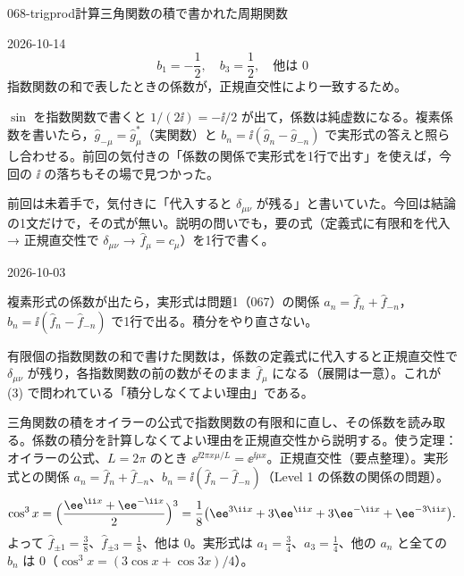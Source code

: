 \documentclass[uplatex,dvipdfmx,a4paper,11pt]{jsarticle}
\begin{document}
\begin{mondai}{068-trigprod}{計算}{三角関数の積で書かれた周期関数}
\begin{kotaeutsushi}{2026-10-14}
\[ b_1=-\frac{1}{2},\quad b_3=\frac{1}{2},\quad\text{他は }0 \]
指数関数の和で表したときの係数が，正規直交性により一致するため。
\end{kotaeutsushi}
\begin{kizuki}
\item {} $\sin$ を指数関数で書くと $1/(2\ii)=-\ii/2$ が出て，係数は純虚数になる。複素係数を書いたら，$\hat{g}_{-\mu}=\hat{g}_{\mu}^{*}$（実関数）と $b_n=\ii(\hat{g}_n-\hat{g}_{-n})$ で実形式の答えと照らし合わせる。前回の気付きの「係数の関係で実形式を1行で出す」を使えば，今回の $\ii$ の落ちもその場で見つかった。
\item {} 前回は未着手で，気付きに「代入すると $\delta_{\mu\nu}$ が残る」と書いていた。今回は結論の1文だけで，その式が無い。説明の問いでも，要の式（定義式に有限和を代入 → 正規直交性で $\delta_{\mu\nu}$ → $\hat{f}_{\mu}=c_{\mu}$）を1行で書く。
\end{kizuki}
\begin{maekizuki}{2026-10-03}
\item 複素形式の係数が出たら，実形式は問題1（067）の関係 $a_n=\hat{f}_n+\hat{f}_{-n}$，$b_n=\ii(\hat{f}_n-\hat{f}_{-n})$ で1行で出る。積分をやり直さない。
\item 有限個の指数関数の和で書けた関数は，係数の定義式に代入すると正規直交性で $\delta_{\mu\nu}$ が残り，各指数関数の前の数がそのまま $\hat{f}_{\mu}$ になる（展開は一意）。これが (3) で問われている「積分しなくてよい理由」である。
\end{maekizuki}
\begin{tadashii}
\houshin 三角関数の積をオイラーの公式で指数関数の有限和に直し、その係数を読み取る。係数の積分を計算しなくてよい理由を正規直交性から説明する。使う定理：オイラーの公式、$L=2\pi$ のとき $\ee^{\ii2\pi x\mu/L}=\ee^{\ii\mu x}$。正規直交性（要点整理）。実形式との関係 $a_n=\hat{f}_n+\hat{f}_{-n}$、$b_n=\ii(\hat{f}_n-\hat{f}_{-n})$（Level 1 の係数の関係の問題）。
\keisan
{}
\[
\cos^{3}x=\Bigl(\frac{\ee^{\ii x}+\ee^{-\ii x}}{2}\Bigr)^{3}=\frac{1}{8}\bigl(\ee^{3\ii x}+3\ee^{\ii x}+3\ee^{-\ii x}+\ee^{-3\ii x}\bigr).
\]
よって $\hat{f}_{\pm1}=\frac{3}{8}$、$\hat{f}_{\pm3}=\frac{1}{8}$、他は $0$。実形式は $a_1=\frac{3}{4}$、$a_3=\frac{1}{4}$、他の $a_n$ と全ての $b_n$ は $0$（$\cos^{3}x=(3\cos x+\cos3x)/4$）。

\end{tadashii}
\end{mondai}
\end{document}
